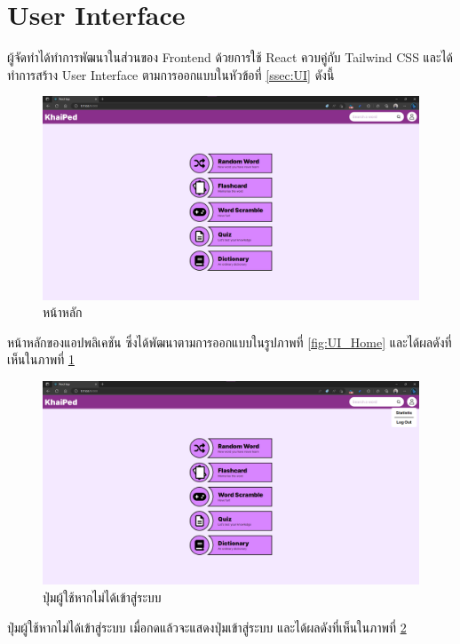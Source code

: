 \documentclass[12pt,oneside,openright,a4paper]{cpe-thai-project}
\begin{document}
\pagebreak
\section{User Interface}
\hspace{1cm}
ผู้จัดทำได้ทำการพัฒนาในส่วนของ Frontend ด้วยการใช้ React ควบคู่กับ Tailwind CSS และได้ทำการสร้าง User Interface
ตามการออกแบบในหัวข้อที่ \ref{ssec:UI} ดังนี้

\begin{figure}[!h]\centering
	\includegraphics[width=\textwidth, keepaspectratio=true]{image/chap4/UI/home.png}
	\caption{{หน้าหลัก}}\label{fig:chap4UIHome}
\end{figure}
\hspace{1cm}
หน้าหลักของแอปพลิเคชัน ซึ่งได้พัฒนาตามการออกแบบในรูปภาพที่ \ref{fig:UI_Home} และได้ผลดังที่เห็นในภาพที่ \ref{fig:chap4UIHome} 

\begin{figure}[!h]\centering
	\includegraphics[width=\textwidth, keepaspectratio=true]{image/chap4/UI/user button.png}
	\caption{{ปุ่มผู้ใช้หากไม่ได้เข้าสู่ระบบ}}\label{fig:chap4UIGuestButton}
\end{figure}
\hspace{1cm}
ปุ่มผู้ใช้หากไม่ได้เข้าสู่ระบบ เมื่อกดแล้วจะแสดงปุ่มเข้าสู่ระบบ และได้ผลดังที่เห็นในภาพที่ \ref{fig:chap4UIGuestButton} 
\end{document}
